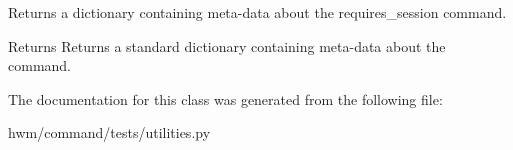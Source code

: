 Returns a dictionary containing meta-\/data about the requires\-\_\-session command. 

\begin{DoxyReturn}{Returns}
Returns a standard dictionary containing meta-\/data about the command. 
\end{DoxyReturn}


The documentation for this class was generated from the following file\-:\begin{DoxyCompactItemize}
\item 
hwm/command/tests/utilities.\-py\end{DoxyCompactItemize}
